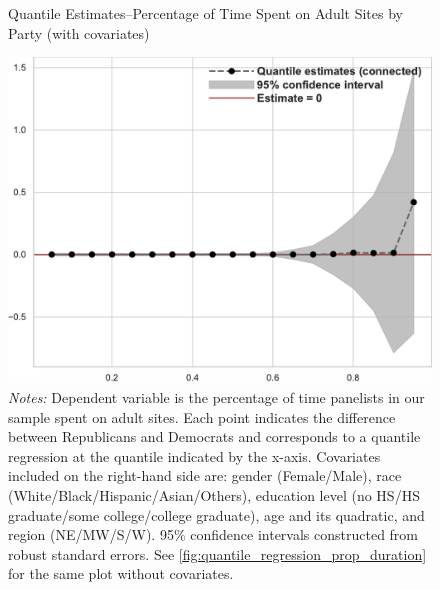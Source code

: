 \documentclass[12pt, letterpaper]{article}
\begin{document}
\begin{figure}[ht]
	\centering
	\caption{Quantile Estimates--Percentage of Time Spent on Adult Sites by Party (with covariates)}
	\includegraphics[width=.55\linewidth]{../figs/quantile_reg_covariates_proportion_duration_adult.pdf}
	\caption*{\footnotesize \emph{Notes:} 
		Dependent variable is the percentage of time panelists in our sample spent on adult sites.
		Each point indicates the difference between Republicans and Democrats and corresponds to a quantile regression at the quantile indicated by the x-axis.
		Covariates included on the right-hand side are: gender (Female/Male), race (White/Black/Hispanic/Asian/Others), education level (no HS/HS graduate/some college/college graduate), age and its quadratic, and region (NE/MW/S/W).
		95\% confidence intervals constructed from robust standard errors.
		See \cref{fig:quantile_regression_prop_duration} for the same plot without covariates.
	}
	\label{fig:quantile_regression_prop_duration_covariates}
\end{figure}
\end{document}
